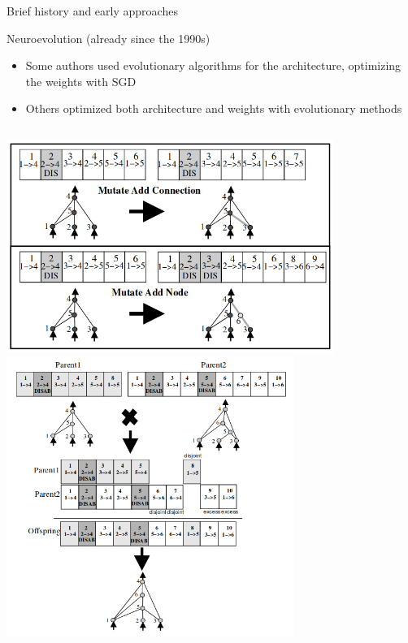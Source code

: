 \begin{frame}[c]{Brief history and early approaches}
\centering
\begin{itemize}
\footnotesize{
	\item \alert{Neuroevolution} (already since the 1990s)
	\begin{itemize}
		\item Some authors used evolutionary algorithms for the
		architecture, optimizing the weights with SGD 
		\item Others optimized both architecture and weights with
		evolutionary methods
	\end{itemize}
}
\end{itemize}

\begin{columns}
\includegraphics[width=0.8\textwidth]{images_lec7/neat.png}
\includegraphics[width=0.7\textwidth]{images_lec7/neat_2.png}
\end{columns}


\end{frame}
